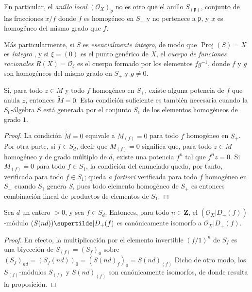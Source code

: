 \documentclass[oneside,10pt]{amsart}
\newcommand{\oldpage}[2][]{\marginnote{\normalfont\footnotesize\textbf{#1}~|~#2}\ignorespaces}
\let\EGAOriginalLabel\label
\renewcommand{\label}[1]{\phantomsection\EGAOriginalLabel{#1}}
\begin{document}
\oldpage[II]{32}
En particular, el \emph{anillo local} $(\mathcal{O}_X)_\mathfrak{p}$ no es otro que el anillo $S_{(\mathfrak{p})}$, conjunto de las fracciones $x/f$ donde $f$ es homogéneo en $S_+$ y no pertenece a $\mathfrak{p}$, y $x$ es homogéneo del mismo grado que $f$.

Más particularmente, si $S$ es \emph{esencialmente íntegro}, de modo que $\operatorname{Proj}(S)=X$ es \emph{íntegro} , y si $\xi=(0)$ es el punto genérico de $X$, el \emph{cuerpo de funciones racionales $R(X)=\mathcal{O}_\xi$} es el cuerpo formado por los elementos $fg^{-1}$, donde $f$ y $g$ son homogéneos del mismo grado en $S_+$ y $g\neq0$.

\begin{proposition}[2.5.6]
\label{II.2.5.6-fr}
Si, para todo $z\in M$ y todo $f$ homogéneo en $S_+$, existe alguna potencia de $f$ que anula $z$, entonces $\widetilde{M}=0$.
Esta condición suficiente es también necesaria cuando la $S_0$-álgebra $S$ está generada por el conjunto $S_1$ de los elementos homogéneos de grado $1$.
\end{proposition}

\begin{proof}
La condición $\widetilde{M}=0$ equivale a $M_{(f)}=0$ para todo $f$ homogéneo en $S_+$.
Por otra parte, si $f\in S_d$, decir que $M_{(f)}=0$ significa que, para todo $z\in M$ homogéneo y de grado múltiplo de $d$, existe una potencia $f^n$ tal que $f^nz=0$.
Si $M_{(f)}=0$ para todo $f\in S_1$, la condición del enunciado queda, por tanto, verificada para todo $f\in S_1$; queda \emph{a fortiori} verificada para todo $f$ homogéneo en $S_+$ cuando $S_1$ genera $S$, pues todo elemento homogéneo de $S_+$ es entonces combinación lineal de productos de elementos de $S_1$.
\end{proof}

\begin{proposition}[2.5.7]
\label{II.2.5.7-fr}
Sea $d$ un entero $>0$, y sea $f\in S_d$.
Entonces, para todo $n\in\mathbf{Z}$, el $(\mathcal{O}_X|D_+(f))$-módulo $(S(nd))\supertilde|D_+(f)$ es canónicamente isomorfo a $\mathcal{O}_X|D_+(f)$.
\end{proposition}

\begin{proof}
En efecto, la multiplicación por el elemento invertible $(f/1)^n$ de $S_f$ es una biyección de $S_{(f)}=(S_f)_0$ sobre
$(S_f)_{nd}=(S_f(nd))_0=(S(nd)_f)_0=S(nd)_{(f)}$
Dicho de otro modo, los $S_{(f)}$-módulos $S_{(f)}$ y $S(nd)_{(f)}$ son canónicamente isomorfos, de donde resulta la proposición.
\end{proof}
\end{document}

